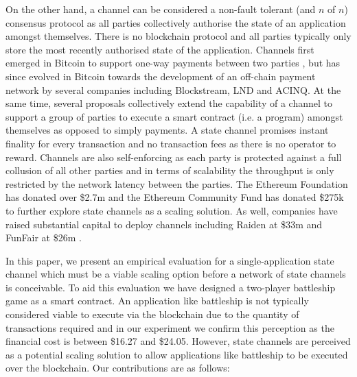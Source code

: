 \documentclass{llncs}
\begin{document}
On the other hand, a channel can be considered a non-fault tolerant (and $n$ of $n$) consensus protocol as all parties collectively authorise the state of an application amongst themselves. 
There is no blockchain protocol and all parties typically only store the most recently authorised state of the application. 
Channels first emerged in Bitcoin to support one-way payments between two parties \cite{spilman2013,decker2015fast}, but has since evolved in Bitcoin towards the development of an off-chain payment network \cite{poon2016bitcoin} by several companies including Blockstream, LND and ACINQ. 
At the same time, several proposals \cite{miller2017sprites,mccorry2018pisa,dziembowski2017perun,statechannelnetworks,coleman2018counterfactual} collectively extend the capability of a channel to support a group of parties to execute a smart contract (i.e. a program) amongst themselves as opposed to simply payments. 
A state channel promises instant finality for every transaction and no transaction fees as there is no operator to reward.
Channels are also self-enforcing as each party is protected against a full collusion of all other parties and in terms of scalability the throughput is only restricted by the network latency between the parties. 
The Ethereum Foundation has donated over \$2.7m \cite{efscaling1,efscaling2,efscaling3}  and the Ethereum Community Fund has donated \$275k \cite{ecfscaling} to further explore state channels as a scaling solution.
As well, companies have raised substantial capital to deploy channels including Raiden at \$33m \cite{raidenICO} and FunFair at \$26m \cite{funfair}.

In this paper, we present an empirical evaluation for a single-application state channel which must be a viable scaling option before a network of state channels is conceivable. 
To aid this evaluation we have designed a two-player battleship game as a smart contract.
An application like battleship is not typically considered viable to execute via the blockchain due to the quantity of transactions required and in our experiment we confirm this perception as the financial cost is between \$16.27 and \$24.05. 
However, state channels are perceived as a potential scaling solution to allow applications like battleship to be executed over the blockchain. 
Our contributions are as follows: 
\end{document}
